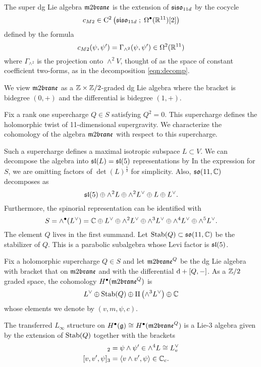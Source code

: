 The super dg Lie algebra $\m2$ is the extension of $\mathfrak{siso}_{11d}$ by the cocycle
  \[
    c_{M2} \in {\rm C}^2\left(\mathfrak{siso}_{11d} \; ; \; \Omega^\bullet (\mathbb R^{11})[2]\right)
  \]
  defined by the formula 
  \[c_{M2} (\psi, \psi') = \Gamma_{\wedge^2}(\psi, \psi') \in \Omega^2(\mathbb R^{11})\]
  where $\Gamma_{\wedge^2}$ is the projection onto $\wedge^2 V$, thought of as the space of constant coefficient two-forms, as in the decomposition \eqref{eqn:decomp}.

We view $\m2$ as a $\mathbb Z \times \mathbb Z/2$-graded dg Lie algebra where the bracket is bidegree $(0,+)$ and the differential is bidegree $(1,+)$.


Fix a rank one supercharge $Q \in S$ satisfying $Q^2 = 0$.
This supercharge defines the holomorphic twist of 11-dimensional supergravity. 
We characterize the cohomology of the algebra $\m2$ with respect to this supercharge. 

Such a supercharge defines a maximal isotropic subspace $L \subset V$. 
We can decompose the algebra into $\mathfrak{sl}(L) = \mathfrak{sl}(5)$ representations by
In the expression for $S$, we are omitting factors of $\det(L)^{\frac12}$ for simplicity. 
Also, $\mathfrak{so}(11, \mathbb C)$ decomposes as
\[
\mathfrak{sl}(5) \oplus \wedge^2 L \oplus \wedge^2 L^\vee \oplus L \oplus L^\vee .
\]
Furthermore, the spinorial representation can be identified with
\[
S = \wedge^\bullet (L^\vee) = \mathbb C \oplus L^\vee \oplus \wedge^2 L^\vee \oplus \wedge^3 L^\vee \oplus \wedge^4 L^\vee \oplus \wedge^5 L^\vee .
\]
The element $Q$ lives in the first summand.
Let ${\rm Stab}(Q) \subset \mathfrak{so}(11,\mathbb C)$ be the stabilizer of $Q$. 
This is a parabolic subalgebra whose Levi factor is $\mathfrak{sl}(5)$.

\begin{prop}\label{prop:model}
Fix a holomorphic supercharge $Q \in S$ and let $\m2^Q$ be the dg Lie algebra with bracket that on $\m2$ and with the differential ${\rm d} + [Q,-]$. 
As a $\mathbb Z/2$ graded space, the cohomology $H^\bu(\m2^Q)$ is
\[
    L^\vee \oplus {\rm Stab}(Q) \oplus \Pi \left(\wedge^3 L^\vee\right) \oplus \mathbb C
  \]
whose elements we denote by $(v, m, \psi, c)$.

The transferred $L_\infty$ structure on $H^\bu(\fg) \cong H^\bu(\m2^Q)$ is a Lie-3 algebra given by the extension of ${\rm Stab}(Q)$ together with the brackets
\begin{align*}
[\psi, \psi']_2 & = \psi \wedge \psi' \in \wedge^4 L \cong L^\vee_v \\
[v, v', \psi]_3 & = \<v \wedge v', \psi\> \in \CC_c .
\end{align*}
\end{prop}

